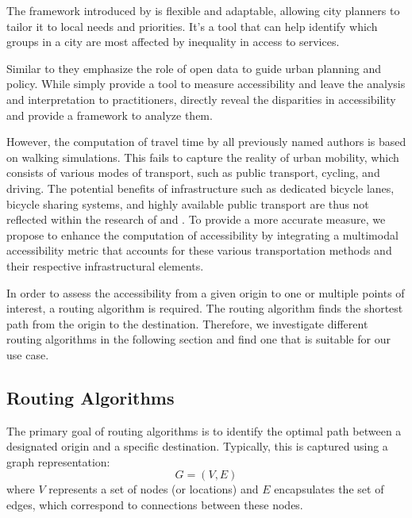 The framework introduced by \cite{nicolettiDisadvantagedCommunitiesHave2023} is flexible and adaptable, allowing city planners to tailor it to local needs and priorities. 
It's a tool that can help identify which groups in a city are most affected by inequality in access to services. 

Similar to \cite{olivariAreItalianCities2023} they emphasize the role of open data to guide urban planning and policy.
While \cite{olivariAreItalianCities2023} simply provide a tool to measure accessibility and leave the analysis and interpretation to practitioners, \cite{nicolettiDisadvantagedCommunitiesHave2023} directly reveal the disparities in accessibility and provide a framework to analyze them.

However, the computation of travel time by all previously named authors is based on walking simulations. 
This fails to capture the reality of urban mobility, which consists of various modes of transport, such as public transport, cycling, and driving.
The potential benefits of infrastructure such as dedicated bicycle lanes, bicycle sharing systems, and highly available public transport are thus not reflected within the research of \cite{olivariAreItalianCities2023} and \cite{nicolettiDisadvantagedCommunitiesHave2023}.
To provide a more accurate measure, we propose to enhance the computation of accessibility by integrating a multimodal accessibility metric that accounts for these various transportation methods and their respective infrastructural elements.


In order to assess the accessibility from a given origin to one or multiple points of interest, a routing algorithm is required.
The routing algorithm finds the shortest path from the origin to the destination.
Therefore, we investigate different routing algorithms in the following section and find one that is suitable for our use case.

\subsection{Routing Algorithms}
\label{subsec:routing_algorithms}

The primary goal of routing algorithms is to identify the optimal path between a designated origin and a specific destination.
Typically, this is captured using a graph representation:
\[ G = (V, E) \]
where $V$ represents a set of nodes (or locations) and $E$ encapsulates the set of edges, which correspond to connections between these nodes.

